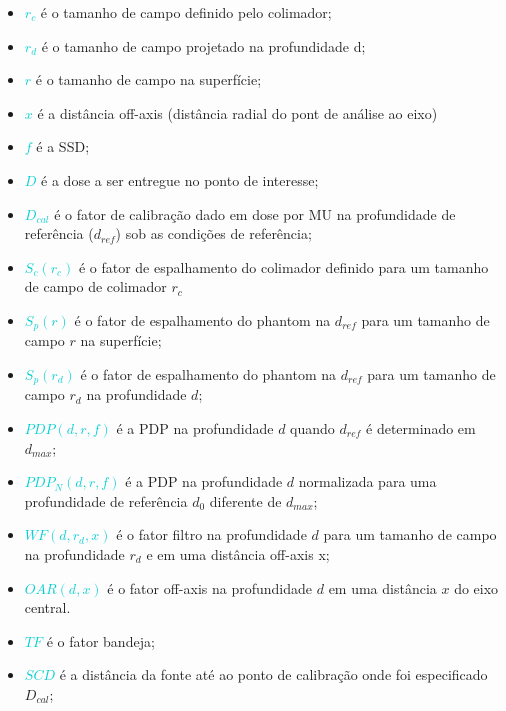 \documentclass[11pt,a4paper]{article}
\newcounter{exemplo}
\begin{document}
    \begin{exemplo}[onde:]
        \begin{itemize}
            \item \textcolor{DarkTurquoise}{$r_c$} é o tamanho de campo definido pelo colimador;
            \item \textcolor{DarkTurquoise}{$r_d$} é o tamanho de campo projetado na profundidade d;
            \item \textcolor{DarkTurquoise}{$r$} é o tamanho de campo na superfície;
            \item \textcolor{DarkTurquoise}{$x$} é a distância off-axis (distância radial do pont de análise ao eixo)
            \item \textcolor{DarkTurquoise}{$f$} é a SSD;
            \item \textcolor{DarkTurquoise}{$D$} é a dose a ser entregue no ponto de interesse;
            \item \textcolor{DarkTurquoise}{$D_{cal}$} é o fator de calibração dado em dose por MU na profundidade de referência ($d_{ref}$) sob as condições de referência;
            \item \textcolor{DarkTurquoise}{$S_c(r_c)$} é o fator de espalhamento do colimador definido para um tamanho de campo de colimador $r_c$
            \item \textcolor{DarkTurquoise}{$S_p(r)$} é o fator de espalhamento do phantom na $d_{ref}$ para um tamanho de campo $r$ na superfície;
            \item \textcolor{DarkTurquoise}{$S_p(r_d)$} é o fator de espalhamento do phantom na $d_{ref}$ para um tamanho de campo $r_d$ na profundidade $d$;
            \item \textcolor{DarkTurquoise}{$PDP(d, r, f)$} é a PDP  na profundidade $d$ quando $d_{ref}$ é determinado em $d_{max}$;
            \item \textcolor{DarkTurquoise}{$PDP_N(d, r, f)$} é a PDP na profundidade $d$ normalizada para uma profundidade de referência $d_{0}$ diferente de $d_{max}$;
            \item \textcolor{DarkTurquoise}{$WF(d, r_d, x)$} é o fator filtro na profundidade $d$ para um tamanho de campo na profundidade $r_d$ e em uma distância off-axis x;
            \item \textcolor{DarkTurquoise}{$OAR(d, x)$} é o fator off-axis na profundidade $d$ em uma distância $x$ do eixo central.
            \item \textcolor{DarkTurquoise}{$TF$} é o fator bandeja;
            \item \textcolor{DarkTurquoise}{$SCD$} é a distância da fonte até ao ponto de calibração onde foi especificado $D_{cal}$;

\end{itemize}
\end{exemplo}
\end{document}
